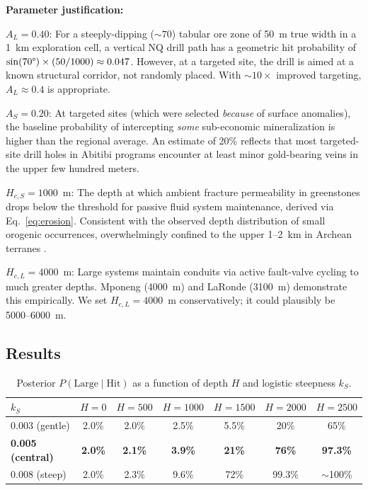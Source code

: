 \documentclass[11pt,a4paper]{article}
\begin{document}
\noindent\textbf{Parameter justification:}

$A_L = 0.40$: For a steeply-dipping (${\sim}70$\textdegree) tabular ore zone of 50~m true width in a 1~km exploration cell, a vertical NQ drill path has a geometric hit probability of $\sin(70\text{\textdegree}) \times (50/1000) \approx 0.047$.
However, at a targeted site, the drill is aimed at a known structural corridor, not randomly placed.
With ${\sim}10\times$ improved targeting, $A_L \approx 0.4$ is appropriate.

$A_S = 0.20$: At targeted sites (which were selected \emph{because} of surface anomalies), the baseline probability of intercepting \emph{some} sub-economic mineralization is higher than the regional average.
An estimate of 20\% reflects that most targeted-site drill holes in Abitibi programs encounter at least minor gold-bearing veins in the upper few hundred meters.

$H_{c,S} = 1000$~m: The depth at which ambient fracture permeability in greenstones drops below the threshold for passive fluid system maintenance, derived via Eq.~\eqref{eq:erosion}.
Consistent with the observed depth distribution of small orogenic occurrences, overwhelmingly confined to the upper 1--2~km in Archean terranes \cite{Robert2001}.

$H_{c,L} = 4000$~m: Large systems maintain conduits via active fault-valve cycling to much greater depths.
Mponeng (4000~m) and LaRonde (3100~m) demonstrate this empirically.
We set $H_{c,L} = 4000$~m conservatively; it could plausibly be 5000--6000~m.

\subsection{Results}

\begin{table}[htbp]
\centering
\caption{Posterior $P(\text{Large} \mid \text{Hit})$ as a function of depth $H$ and logistic steepness $k_S$.}\label{tab:results}
\smallskip
\begin{tabular}{lcccccc}
\toprule
$k_S$ & $H=0$ & $H=500$ & $H=1000$ & $H=1500$ & $H=2000$ & $H=2500$ \\
\midrule
0.003 (gentle) & 2.0\% & 2.0\% & 2.5\% & 5.5\% & 20\% & 65\% \\
\textbf{0.005 (central)} & \textbf{2.0\%} & \textbf{2.1\%} & \textbf{3.9\%} & \textbf{21\%} & \textbf{76\%} & \textbf{97.3\%} \\
0.008 (steep) & 2.0\% & 2.3\% & 9.6\% & 72\% & 99.3\% & ${\sim}$100\% \\
\bottomrule
\end{tabular}
\end{table}
\end{document}
